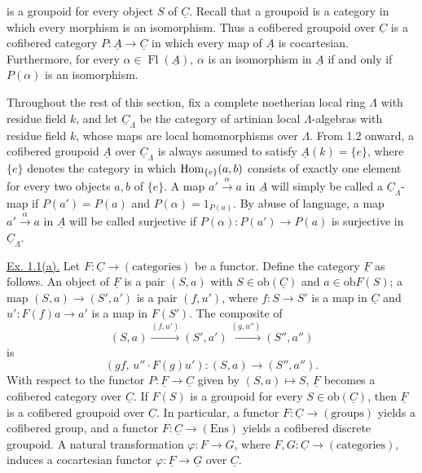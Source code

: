 
is a groupoid for every object $S$ of $\underline C$. Recall that a
groupoid is a category in which every morphism is an isomorphism. Thus a
cofibered groupoid over $\underline C$ is a cofibered category
$P:\underline A\longrightarrow\underline C$ in which every map of
$\underline A$ is cocartesian. Furthermore, for every
$\alpha\in\operatorname{Fl}(\underline A)$, $\alpha$ is an isomorphism
in $\underline A$ if and only if $P(\alpha)$ is an isomorphism.

Throughout the rest of this section, fix a complete noetherian local ring
$\Lambda$ with residue field $k$, and let $\underline C_\Lambda$ be the
category of artinian local $\Lambda$-algebras with residue field $k$,
whose maps are local homomorphisms over $\Lambda$. From 1.2 onward, a
cofibered groupoid $\underline A$ over $\underline C_\Lambda$ is always
assumed to satisfy $\underline A(k)=\{e\}$, where $\{e\}$ denotes the
category in which $\operatorname{Hom}_{\{e\}}(a,b)$ consists of exactly one element
for every two objects $a,b$ of $\{e\}$. A map
$a'\xrightarrow{\alpha}a$ in $\underline A$ will simply be called a
$\underline C_\Lambda$-map if $P(a')=P(a)$ and
$P(\alpha)=1_{P(a)}$. By abuse of language, a map
$a'\xrightarrow{\alpha}a$ in $\underline A$ will be called surjective
if $P(\alpha):P(a')\longrightarrow P(a)$ is surjective in
$\underline C_\Lambda$.

\underline{Ex. 1.1(a).} Let
$F:\underline C\longrightarrow(\text{categories})$ be a functor.
Define the category $\underline F$ as follows. An object of
$\underline F$ is a pair $(S,a)$ with
$S\in\mathrm{ob}(\underline C)$ and $a\in\mathrm{ob}F(S)$; a map
$(S,a)\longrightarrow(S',a')$ is a pair $(f,u')$, where
$f:S\longrightarrow S'$ is a map in $\underline C$ and
$u':F(f)a\longrightarrow a'$ is a map in $F(S')$. The composite of
\[
 (S,a)\xrightarrow{(f,u')}(S',a')
 \xrightarrow{(g,u'')}(S'',a'')
\]
is
\[
 (gf,\,u''\mathbin{\cdot}F(g)u'):(S,a)\longrightarrow(S'',a'').
\]
With respect to the functor
$P:\underline F\longrightarrow\underline C$ given by
$(S,a)\longmapsto S$, $\underline F$ becomes a cofibered category over
$\underline C$. If $F(S)$ is a groupoid for every
$S\in\mathrm{ob}(\underline C)$, then $\underline F$ is a cofibered
groupoid over $\underline C$. In particular, a functor
$F:\underline C\longrightarrow(\text{groups})$ yields a cofibered
group, and a functor $F:\underline C\longrightarrow(\mathrm{Ens})$
yields a cofibered discrete groupoid. A natural transformation
$\varphi:F\longrightarrow G$, where $F,G:\underline C\longrightarrow
(\text{categories})$, induces a cocartesian functor
$\varphi:\underline F\longrightarrow\underline G$ over $\underline C$.

